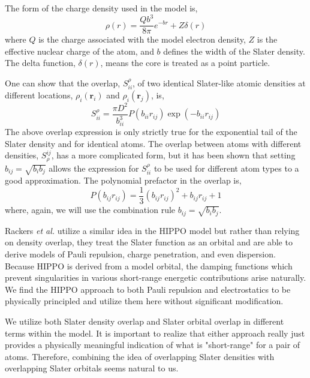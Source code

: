 \documentclass[journal=jacsat,manuscript=article]{achemso}
\begin{document}
The form of the charge density used in the model is,
\begin{equation}
  \rho(r)=\frac{Qb^3}{8\pi}e^{-br}+Z\delta(r)
  \label{eq:slater}
\end{equation}
\noindent
where $Q$ is the charge associated with the model electron density,
$Z$ is the effective nuclear charge of the atom, and $b$ defines the width
of the Slater density. The delta function, $\delta(r)$, means the core is
treated as a point particle.

One can show that the overlap, $S_{ii}^\rho$, of two identical Slater-like atomic densities
at different locations, $\rho_i(\bm{r}_i)$ and $\rho_i(\bm{r}_j)$, is,
\begin{equation}
  S_{ii}^\rho=\frac{\pi D^2}{b_{ii}^3}P(b_{ii}r_{ij})\exp(-b_{ii}r_{ij})
\end{equation}
The above overlap expression is only strictly true for the exponential tail
of the Slater density and for identical atoms. The overlap between atoms
with different densities, $S^{ij}_\rho$, has a more complicated form, but
it has been shown that setting $b_{ij}=\sqrt{b_ib_j}$ allows the expression
for $S_{ii}^\rho$ to be used for different atom types to a good
approximation\cite{van2016beyond}. The polynomial prefactor in the overlap is,
\begin{equation}
  P(b_{ij}r_{ij})=\frac13(b_{ij}r_{ij})^2 + b_{ij}r_{ij}+1
\end{equation}
where, again, we will use the combination rule $b_{ij}=\sqrt{b_ib_j}$.

Rackers \textit{et al.} utilize a similar idea in the HIPPO model\cite{rackers2021polarizable} but rather than relying on density overlap, they treat the Slater function as an orbital and are able to derive models of Pauli repulsion, charge penetration, and even dispersion. Because HIPPO is derived from a model orbital, the damping functions which prevent singularities in various short-range energetic contributions arise naturally. We find the HIPPO approach to both Pauli repulsion and electrostatics to be physically principled and utilize them here without significant modification.

We utilize both Slater density overlap and Slater orbital overlap in different terms within the model. It is important to realize that either approach really just provides a physically meaningful indication of what is "short-range" for a pair of atoms. Therefore, combining the idea of overlapping Slater densities with overlapping Slater orbitals seems natural to us.
\end{document}
